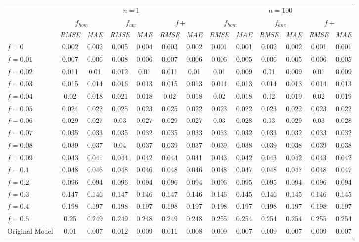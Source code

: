 \begin{tabular}{@{}lcccccccccccc@{}}
\toprule
 & \multicolumn{6}{c}{$n=1$} & \multicolumn{6}{c}{$n=100$} \\
\cmidrule(lr){2-7} \cmidrule(lr){8-13}
 & \multicolumn{2}{c}{$f_{hom}$} & \multicolumn{2}{c}{$f_{anc}$} & \multicolumn{2}{c}{$f+$} & \multicolumn{2}{c}{$f_{hom}$} & \multicolumn{2}{c}{$f_{anc}$} & \multicolumn{2}{c}{$f+$} \\
\cmidrule(lr){2-3} \cmidrule(lr){4-5} \cmidrule(lr){6-7} \cmidrule(lr){8-9} \cmidrule(lr){10-11} \cmidrule(lr){12-13}
 & \textit{RMSE} & \textit{MAE} & \textit{RMSE} & \textit{MAE} & \textit{RMSE} & \textit{MAE} & \textit{RMSE} & \textit{MAE} & \textit{RMSE} & \textit{MAE} & \textit{RMSE} & \textit{MAE} \\
\midrule
$f = 0$ & 0.002 & 0.002 & 0.005 & 0.004 & 0.003 & 0.002 & 0.001 & 0.001 & 0.002 & 0.002 & 0.001 & 0.001 \\
$f = 0.01$ & 0.007 & 0.006 & 0.008 & 0.006 & 0.007 & 0.006 & 0.006 & 0.005 & 0.006 & 0.005 & 0.006 & 0.005 \\
$f = 0.02$ & 0.011 & 0.01 & 0.012 & 0.01 & 0.011 & 0.01 & 0.01 & 0.009 & 0.01 & 0.009 & 0.01 & 0.009 \\
$f = 0.03$ & 0.015 & 0.014 & 0.016 & 0.013 & 0.015 & 0.013 & 0.014 & 0.013 & 0.014 & 0.013 & 0.014 & 0.013 \\
$f = 0.04$ & 0.02 & 0.018 & 0.021 & 0.018 & 0.02 & 0.018 & 0.02 & 0.018 & 0.02 & 0.019 & 0.02 & 0.019 \\
$f = 0.05$ & 0.024 & 0.022 & 0.025 & 0.023 & 0.025 & 0.022 & 0.023 & 0.022 & 0.023 & 0.022 & 0.023 & 0.022 \\
$f = 0.06$ & 0.029 & 0.027 & 0.03 & 0.027 & 0.029 & 0.027 & 0.03 & 0.028 & 0.03 & 0.029 & 0.03 & 0.028 \\
$f = 0.07$ & 0.035 & 0.033 & 0.035 & 0.032 & 0.035 & 0.033 & 0.033 & 0.032 & 0.033 & 0.032 & 0.033 & 0.032 \\
$f = 0.08$ & 0.039 & 0.037 & 0.04 & 0.037 & 0.039 & 0.037 & 0.039 & 0.038 & 0.039 & 0.038 & 0.039 & 0.038 \\
$f = 0.09$ & 0.043 & 0.041 & 0.044 & 0.042 & 0.044 & 0.041 & 0.043 & 0.042 & 0.043 & 0.042 & 0.043 & 0.042 \\
$f = 0.1$ & 0.048 & 0.046 & 0.048 & 0.046 & 0.048 & 0.046 & 0.048 & 0.047 & 0.048 & 0.047 & 0.048 & 0.047 \\
$f = 0.2$ & 0.096 & 0.094 & 0.096 & 0.094 & 0.096 & 0.094 & 0.096 & 0.095 & 0.095 & 0.094 & 0.096 & 0.094 \\
$f = 0.3$ & 0.147 & 0.146 & 0.147 & 0.146 & 0.147 & 0.146 & 0.146 & 0.145 & 0.146 & 0.145 & 0.146 & 0.145 \\
$f = 0.4$ & 0.198 & 0.197 & 0.198 & 0.197 & 0.198 & 0.197 & 0.198 & 0.197 & 0.198 & 0.197 & 0.198 & 0.197 \\
$f = 0.5$ & 0.25 & 0.249 & 0.249 & 0.248 & 0.249 & 0.248 & 0.255 & 0.254 & 0.254 & 0.254 & 0.255 & 0.254 \\
Original Model & 0.01 & 0.007 & 0.012 & 0.009 & 0.011 & 0.008 & 0.009 & 0.007 & 0.009 & 0.007 & 0.009 & 0.007 \\
\bottomrule
\end{tabular}
